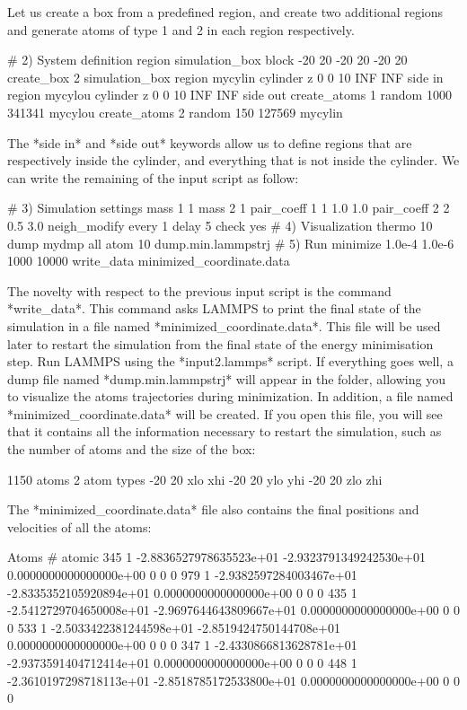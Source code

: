 Let us create a box from a predefined region,
and create two additional regions and generate
atoms of type 1 and 2 in each region respectively.

\begin{lcverbatim}
# 2) System definition
region simulation_box block -20 20 -20 20 -20 20
create_box 2 simulation_box
region mycylin cylinder z 0 0 10 INF INF side in
region mycylou cylinder z 0 0 10 INF INF side out
create_atoms 1 random 1000 341341 mycylou
create_atoms 2 random 150 127569 mycylin
\end{lcverbatim}

The *side in* and *side out* keywords
allow us to define regions that are respectively inside the
cylinder, and everything that is not inside the cylinder.
We can write the remaining of the input script as follow:

\begin{lcverbatim}
# 3) Simulation settings
mass 1 1
mass 2 1
pair_coeff 1 1 1.0 1.0
pair_coeff 2 2 0.5 3.0
neigh_modify every 1 delay 5 check yes
# 4) Visualization
thermo 10
dump mydmp all atom 10 dump.min.lammpstrj
# 5) Run
minimize 1.0e-4 1.0e-6 1000 10000
write_data minimized_coordinate.data
\end{lcverbatim}

The novelty with respect to the previous
input script is the command *write_data*. This command
asks LAMMPS to print the final state of the simulation in
a file named *minimized_coordinate.data*. This file will
be used later to restart the simulation from the final
state of the energy minimisation step.
Run LAMMPS using the *input2.lammps* script. If everything
goes well, a dump file named *dump.min.lammpstrj* will
appear in the folder, allowing you to visualize the atoms
trajectories during minimization. In
addition, a file named *minimized_coordinate.data* will be
created. If you open this file, you will see that it
contains all the information necessary to restart the
simulation, such as the number of atoms and the size of
the box:

\begin{lcverbatim}
1150 atoms
2 atom types
-20 20 xlo xhi
-20 20 ylo yhi
-20 20 zlo zhi
\end{lcverbatim}

The *minimized_coordinate.data* file also contains the final
positions and velocities of all the atoms:

\begin{lcverbatim}
Atoms # atomic
345 1 -2.8836527978635523e+01 -2.9323791349242530e+01 0.0000000000000000e+00 0 0 0
979 1 -2.9382597284003467e+01 -2.8335352105920894e+01 0.0000000000000000e+00 0 0 0
435 1 -2.5412729704650008e+01 -2.9697644643809667e+01 0.0000000000000000e+00 0 0 0
533 1 -2.5033422381244598e+01 -2.8519424750144708e+01 0.0000000000000000e+00 0 0 0
347 1 -2.4330866813628781e+01 -2.9373591404712414e+01 0.0000000000000000e+00 0 0 0
448 1 -2.3610197298718113e+01 -2.8518785172533800e+01 0.0000000000000000e+00 0 0 0
\end{lcverbatim}

